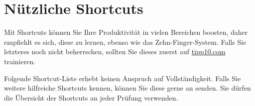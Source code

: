 \fancyhfoffset{0pt}

\chapter{Nützliche Shortcuts}\label{sec:shortcuts}\clearpage
Mit Shortcuts können Sie Ihre Produktivität in vielen Bereichen boosten, daher empfiehlt es sich, diese zu lernen, ebenso wie das Zehn-Finger-System. Falls Sie letzteres noch nicht beherrschen, sollten Sie dieses zuerst auf \href{https://www.tipp10.com/de/}{tipp10.com} trainieren.

Folgende Shortcut-Liste erhebt keinen Anspruch auf Vollständigkeit. Falls Sie weitere hilfreiche Shortcuts kennen, können Sie diese gerne an \href{mailto:\firstmainauthormail}{\firstmainauthor} senden. Sie dürfen die Übersicht der Shortcuts an jeder Prüfung verwenden.
